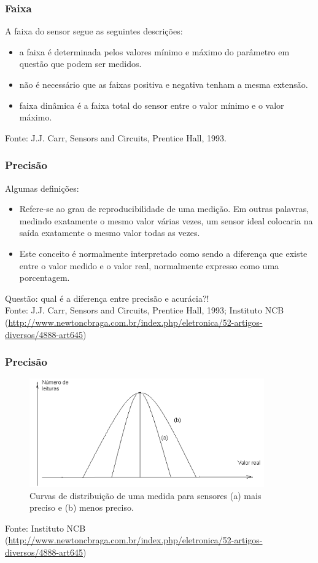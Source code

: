 \documentclass{beamer}
\begin{document}
\begin{frame}
	\frametitle{Faixa}
	A faixa do sensor segue as seguintes descrições:
	\begin{itemize}
		\item a faixa é determinada pelos valores mínimo e máximo do parâmetro em questão que podem ser medidos.
		\item não é necessário que as faixas positiva e negativa tenham a mesma extensão.
		\item faixa dinâmica é a faixa total do sensor entre o valor mínimo e o valor máximo.
	\end{itemize}
	{\scriptsize Fonte: J.J. Carr, Sensors and Circuits, Prentice Hall, 1993.}
\end{frame}

\begin{frame}
	\frametitle{Precisão}
	Algumas definições:
	\begin{itemize}
		\item  Refere-se ao grau de reproducibilidade de uma medição. Em outras palavras, medindo exatamente o mesmo valor várias vezes, um sensor ideal colocaria na saída exatamente o mesmo valor todas as vezes.
		\item Este conceito é normalmente interpretado como sendo a diferença que existe entre o valor medido e o valor real, normalmente expresso como uma porcentagem.
	\end{itemize}
	Questão: qual é a diferença entre precisão e acurácia?!\\
	\bigskip
	{\scriptsize Fonte: J.J. Carr, Sensors and Circuits, Prentice Hall, 1993; Instituto NCB (\url{http://www.newtoncbraga.com.br/index.php/eletronica/52-artigos-diversos/4888-art645})} 
\end{frame}

\begin{frame}
	\frametitle{Precisão}
	\begin{figure}
		\includegraphics[width=0.9\textwidth]{precisao}
		\caption{Curvas de distribuição de uma medida para sensores (a) mais preciso e (b) menos preciso.}
	\end{figure}
	{\scriptsize Fonte: Instituto NCB (\url{http://www.newtoncbraga.com.br/index.php/eletronica/52-artigos-diversos/4888-art645})}
\end{frame}
\end{document}
